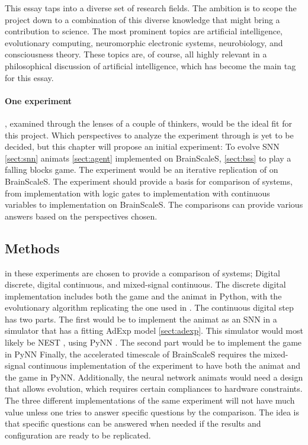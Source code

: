 This essay taps into a diverse set of research fields. The ambition is to scope the project down to a combination of this diverse knowledge that might bring a contribution to science. The most prominent topics are artificial intelligence, evolutionary computing, neuromorphic electronic systems, neurobiology, and consciousness theory.
These topics are, of course, all highly relevant in a philosophical discussion of artificial intelligence, which has become the main tag for this essay.

\paragraph{One experiment}, examined through the lenses of a couple of thinkers, would be the ideal fit for this project.
Which perspectives to analyze the experiment through is yet to be decided, but this chapter will propose an initial experiment:
To evolve SNN \vref{sect:snn} animats \vref{sect:agent} implemented on BrainScaleS, \vref{sect:bss} to play a falling blocks game.
The experiment would be an iterative replication of \cite{albantakis_evolution_2014} on BrainScaleS.
The experiment should provide a basis for comparison of systems, from implementation with logic gates to implementation with continuous variables to implementation on BrainScaleS.
The comparisons can provide various answers based on the perspectives chosen.

\subsection{Methods} in these experiments are chosen to provide a comparison of systems; Digital discrete, digital continuous, and mixed-signal continuous.
The discrete digital implementation includes both the game and the animat in Python, with the evolutionary algorithm replicating the one used in \cite{albantakis_evolution_2014}.
The continuous digital step has two parts. The first would be to implement the animat as an SNN in a simulator that has a fitting AdExp model \vref{sect:adexp}. This simulator would most likely be NEST \cite{fardet_nest_2020}, using PyNN \cite{davison_pynn_2009}. The second part would be to implement the game in PyNN
Finally, the accelerated timescale of BrainScaleS requires the mixed-signal continuous implementation of the experiment to have both the animat and the game in PyNN.
Additionally, the neural network animats would need a design that allows evolution, which requires certain compliances to hardware constraints.
The three different implementations of the same experiment will not have much value unless one tries to answer specific questions by the comparison.
The idea is that specific questions can be answered when needed if the results and configuration are ready to be replicated.

